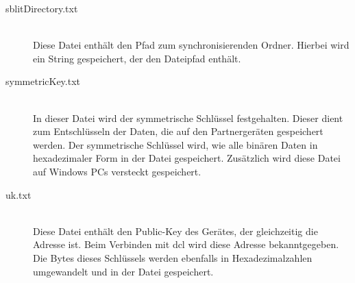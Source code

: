 \begin{description}
	\item[{sblitDirectory.txt}] \hfill \\
	Diese Datei enthält den Pfad zum synchronisierenden Ordner. Hierbei wird ein String gespeichert, der den Dateipfad enthält.
	\item[{symmetricKey.txt}] \hfill \\
	In dieser Datei wird der symmetrische Schlüssel festgehalten. Dieser dient zum Entschlüsseln der Daten, die auf den Partnergeräten gespeichert werden. Der symmetrische Schlüssel wird, wie alle binären Daten in hexadezimaler Form in der Datei gespeichert. Zusätzlich wird diese Datei auf Windows PCs versteckt gespeichert.
	\item[{uk.txt}] \hfill \\
	Diese Datei enthält den Public-Key des Gerätes, der gleichzeitig die Adresse ist. Beim Verbinden mit \gls{dcl} wird diese Adresse bekanntgegeben. Die Bytes dieses Schlüssels werden ebenfalls in Hexadezimalzahlen umgewandelt und in der Datei gespeichert.
\end{description}